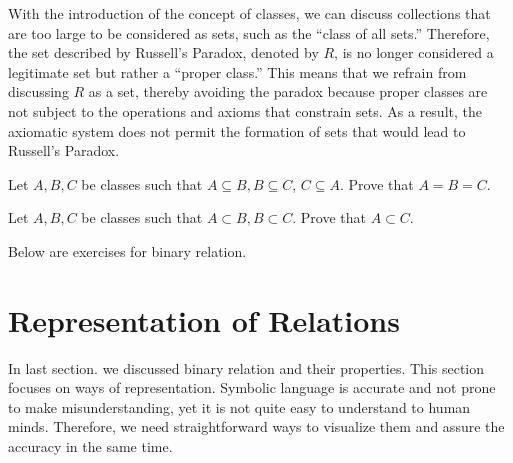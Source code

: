 \begin{solution}
    With the introduction of the concept of classes, we can discuss collections 
    that are too large to be considered as sets, such as the ``class of all sets.'' 
    Therefore, the set described by Russell's Paradox, denoted by \( R \), 
    is no longer considered a legitimate set but rather a ``proper class.'' 
    This means that we refrain from discussing \( R \) as a set, thereby avoiding 
    the paradox because proper classes are not subject to the operations and 
    axioms that constrain sets. As a result, the axiomatic system does not 
    permit the formation of sets that would lead to Russell's Paradox.

\end{solution}
\begin{exercise}
    Let $A,B,C$ be classes such that $A\subseteq B,B\subseteq C$, $C\subseteq A.$ Prove that $A=B=C.$
\end{exercise}

\begin{exercise}
    Let $A,B,C$ be classes such that $A\subset B,B\subset C.$ Prove that $A\subset C.$
\end{exercise}

Below are exercises for binary relation.




\section{Representation of Relations}
In last section. we discussed binary relation and their properties. This section focuses on ways of representation. Symbolic language is accurate and not prone to make misunderstanding, yet it is not quite easy to understand to human minds. Therefore, we need straightforward ways to visualize them and assure the accuracy in the same time.
